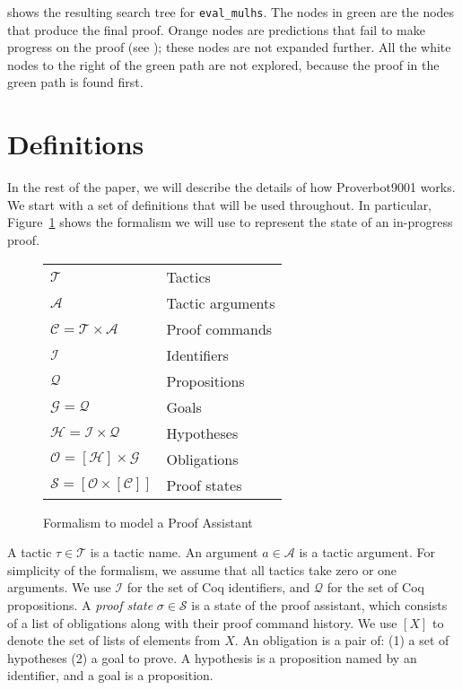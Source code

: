 \documentclass[sigplan,screen]{acmart}
\newcommand{\name}{Proverbot9001\xspace}
\newcommand{\States}{\mathcal{S}}
\newcommand{\Obligations}{\mathcal{O}}
\newcommand{\Hypotheses}{\mathcal{H}}
\newcommand{\Goals}{\mathcal{G}}
\newcommand{\Idents}{\mathcal{I}}
\newcommand{\Props}{\mathcal{Q}}
\newcommand{\Tactics}{\mathcal{T}}
\newcommand{\Args}{\mathcal{A}}
\newcommand{\Commands}{\mathcal{C}}
\newcommand{\st}{\sigma}
\newcommand{\tac}{\tau}
\newcommand{\argu}{a}
\renewcommand{\>}{\quad}
\begin{document}
 shows the resulting search tree for \texttt{eval_mulhs}.
The nodes in green are the nodes that produce the final proof.
Orange nodes are predictions
  that fail to make progress on the proof (see );
  these nodes are not expanded further.
All the white nodes to the right of the green path are not explored,
  because the proof in the green path is found first.
 \section{Definitions}

In the rest of the paper, we will describe the details of how \name{} works.
We start with a set of definitions that will be used throughout.
In particular, Figure~\ref{fig:defns} shows the formalism we will use to represent the state of an in-progress proof.
\begin{figure}
\begin{tabular}{ll}
$\Tactics$ & Tactics \\
$\Args$ & Tactic arguments\\
$\Commands = \Tactics \times \Args$ & Proof commands \\
$\Idents$ & Identifiers\\
$\Props$ & Propositions \\
$\Goals = \Props$ & Goals \\
$\Hypotheses = \Idents \times \Props$ & Hypotheses \\
$\Obligations = [\Hypotheses] \times \Goals$ & Obligations \\
$\States = [\Obligations \times [\Commands]] $ & Proof states \\
\end{tabular}
\caption{Formalism to model a Proof Assistant}
\label{fig:defns}
\end{figure}
A tactic $\tac \in \Tactics$ is a tactic name.
An argument $\argu \in \Args$ is a tactic argument.
For simplicity of the formalism, we assume that all tactics take zero or one arguments.
We use $\Idents$ for the set of Coq identifiers, and $\Props$ for the set of Coq propositions.
A \emph{proof state} $\st \in \States$ is a state of the proof assistant, which consists of a list of obligations along with their proof command history.
We use $[X]$ to denote the set of lists of elements from $X$.
An obligation is a pair of: (1) a set of hypotheses (2) a goal to prove.
A hypothesis is a proposition named by an identifier, and a goal is a proposition.
\end{document}
